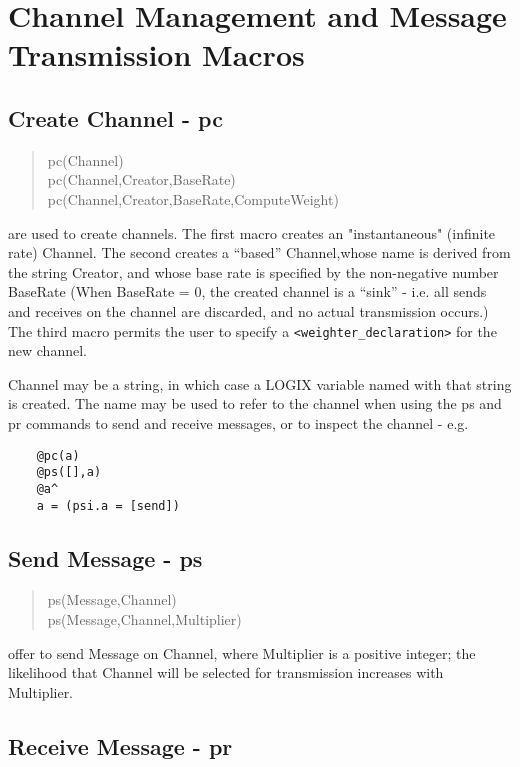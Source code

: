 \section{Channel Management and Message Transmission Macros}

\subsection{Create Channel - pc}

\begin{verse}
pc(Channel) \\
pc(Channel,Creator,BaseRate)
pc(Channel,Creator,BaseRate,ComputeWeight)
\end{verse}

\noindent
are used to create channels.  The first macro creates an "instantaneous"
(infinite rate) Channel.  The second creates a ``based'' Channel,whose
name is derived from the string Creator, and whose base rate is specified by
the non-negative number BaseRate (When BaseRate = 0, the created
channel is a ``sink'' -
i.e. all sends and receives on the channel are discarded, and no actual
transmission occurs.)  The third macro permits the user to specify a
\verb+<weighter_declaration>+ for the new channel.

\noindent
Channel may be a string, in which case a LOGIX variable named with that
string is created.  The name may be used to refer to the channel
when using the ps and pr commands to send and receive messages, or
to inspect the channel - e.g.
\begin{verbatim}
    @pc(a)
    @ps([],a)
    @a^
    a = (psi.a = [send])
\end{verbatim}

\subsection{Send Message - ps}

\begin{verse}
ps(Message,Channel) \\
ps(Message,Channel,Multiplier)
\end{verse}

\noindent
offer to send Message on Channel, where Multiplier is a positive integer;
the likelihood that Channel will be selected for transmission
increases with Multiplier.

\subsection{Receive Message - pr}

